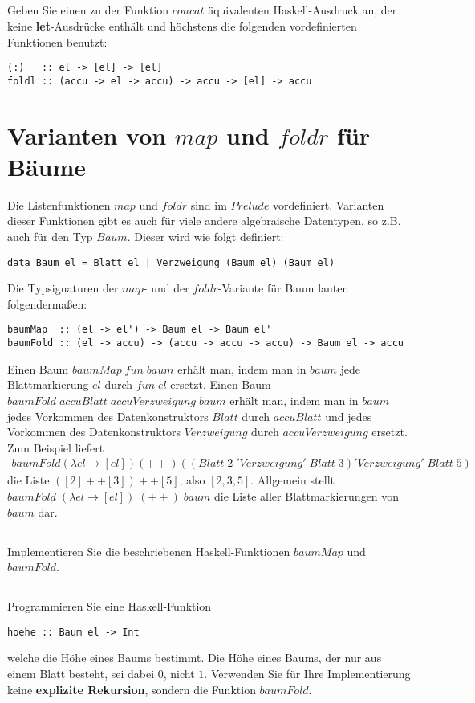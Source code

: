 \documentclass{article}
\begin{document}
\subsection{}
Geben Sie einen zu der Funktion $concat$ äquivalenten Haskell-Ausdruck an, der keine
\textbf{let}-Ausdrücke enthält und höchstens die folgenden vordefinierten Funktionen
benutzt:
\begin{lstlisting}
(:)   :: el -> [el] -> [el]
foldl :: (accu -> el -> accu) -> accu -> [el] -> accu
\end{lstlisting}
\section{Varianten von $map$ und $foldr$ für Bäume}
Die Listenfunktionen $map$ und $foldr$ sind im $Prelude$ vordefiniert. Varianten dieser
Funktionen gibt es auch für viele andere algebraische Datentypen, so z.B. auch für den
Typ $Baum$. Dieser wird wie folgt definiert:
\begin{lstlisting}
data Baum el = Blatt el | Verzweigung (Baum el) (Baum el)
\end{lstlisting}
Die Typsignaturen der $map$- und der $foldr$-Variante für Baum lauten folgendermaßen:
\begin{lstlisting}
baumMap  :: (el -> el') -> Baum el -> Baum el'
baumFold :: (el -> accu) -> (accu -> accu -> accu) -> Baum el -> accu
\end{lstlisting}
Einen Baum $baumMap \;fun \;baum$ erhält man, indem man in $baum$ jede Blattmarkierung $el$
durch $fun\;el$ ersetzt. Einen Baum $baumFold \;accuBlatt \;accuVerzweigung \;baum$ erhält man,
indem man in $baum$ jedes Vorkommen des Datenkonstruktors $Blatt$ durch $accuBlatt$ und
jedes Vorkommen des Datenkonstruktors $Verzweigung$ durch $accuVerzweigung$ ersetzt.
Zum Beispiel liefert
\begin{align*}
baumFold (\lambda el \to [el]) (++) ((Blatt \;2 \;'Verzweigung' \;Blatt \;3) 'Verzweigung' \;Blatt\;5)
\end{align*}
die Liste $([2] ++ [3]) ++ [5]$, also $[2, 3, 5]$. Allgemein stellt $baumFold \;(\lambda el \to [el]) \;(++)\; baum$
die Liste aller Blattmarkierungen von $baum$ dar.
\subsection{}
Implementieren Sie die beschriebenen Haskell-Funktionen $baumMap$ und $baumFold$.
\subsection{}
Programmieren Sie eine Haskell-Funktion 
\begin{lstlisting}
hoehe :: Baum el -> Int
\end{lstlisting}
welche die Höhe
eines Baums bestimmt. Die Höhe eines Baums, der nur aus einem Blatt besteht, sei
dabei $0$, nicht $1$. Verwenden Sie für Ihre Implementierung keine \textbf{explizite Rekursion},
sondern die Funktion $baumFold$.
\end{document}
